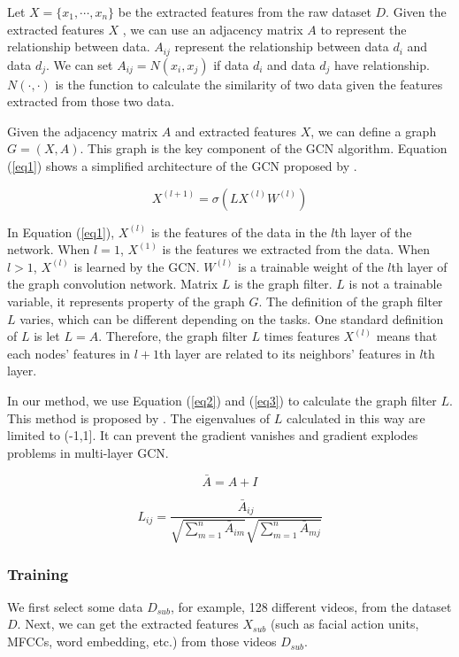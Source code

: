 \documentclass[11pt]{article}
\begin{document}
Let $X = \{x_1,\cdots,x_n \}$ be the extracted features from the raw dataset $D$. Given the extracted features $X$ , we can use an adjacency matrix $A$ to represent the relationship between data. $A_{ij}$ represent the relationship between data $d_i$ and data $d_j$. We can set $A_{ij} = N(x_i, x_j)$ if data $d_i$ and data $d_j$ have relationship. $N(\cdot,\cdot)$ is the function to calculate the similarity of two data given the features extracted from those two data. 

Given the adjacency matrix $A$ and extracted features $X$, we can define a graph $G = (X, A)$. This graph is the key component of the GCN algorithm. Equation (\ref{eq1}) shows a simplified architecture of the GCN proposed by \cite{kipf2017semi}.

\begin{equation}
X^{(l+1)}=\sigma (LX^{(l)}W^{(l)})
\label{eq1}
\end{equation}

In Equation (\ref{eq1}), $X^{(l)}$ is the features of the data in the $l$th layer of the network.
When $l = 1$, $X^{(1)}$ is the features we extracted from the data. When $l>1$, $X^{(l)}$ is learned by the GCN.
$W^{(l)}$ is a trainable weight of the $l$th layer of the graph convolution network.
Matrix $L$ is the graph filter. $L$ is not a trainable variable, it represents property of the graph $G$. The definition of the graph filter $L$ varies, which can be different depending on the tasks. One standard definition of $L$ is let $L = A$. Therefore, the graph filter $L$ times features $X^{(l)}$ means that each nodes' features in $l+1$th layer are related to its neighbors' features in $l$th layer.

In our method, we use Equation (\ref{eq2}) and (\ref{eq3}) to calculate the graph filter $L$.
This method is proposed by \cite{kipf2017semi}. 
The eigenvalues of $L$ calculated in this way are limited to (-1,1]. It can prevent the 
gradient vanishes and gradient explodes problems in multi-layer GCN.

\begin{equation}
\bar{A}= A + I
\label{eq2}
\end{equation}

\begin{equation}
L_{ij}=\frac{\bar{A}_{ij}}{\sqrt{\sum_{m=1}^{n} \bar{A}_{im}}
\sqrt{\sum_{m=1}^{n} \bar{A}_{mj}}} 
\label{eq3}
\end{equation}

\subsubsection{Training}
We first select some data $D_{sub}$, for example, 128 different videos, from the dataset $D$. Next, we can get the extracted features $X_{sub}$ 
(such as facial action units, MFCCs, word embedding, etc.) from those videos $D_{sub}$.
\end{document}
